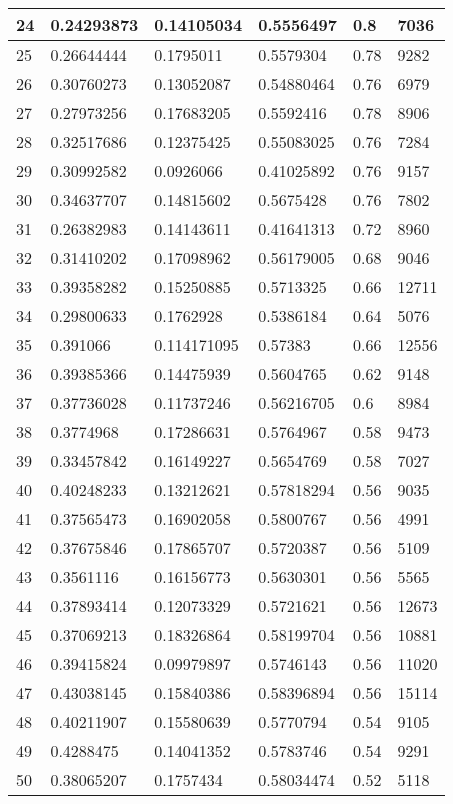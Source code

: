 \begin{longtable}{|l|l|l|l|l|l|}
24 & 0.24293873 & 0.14105034 & 0.5556497 & 0.8 & 7036 \\ \hline 
25 & 0.26644444 & 0.1795011 & 0.5579304 & 0.78 & 9282 \\ \hline 
26 & 0.30760273 & 0.13052087 & 0.54880464 & 0.76 & 6979 \\ \hline 
27 & 0.27973256 & 0.17683205 & 0.5592416 & 0.78 & 8906 \\ \hline 
28 & 0.32517686 & 0.12375425 & 0.55083025 & 0.76 & 7284 \\ \hline 
29 & 0.30992582 & 0.0926066 & 0.41025892 & 0.76 & 9157 \\ \hline 
30 & 0.34637707 & 0.14815602 & 0.5675428 & 0.76 & 7802 \\ \hline 
31 & 0.26382983 & 0.14143611 & 0.41641313 & 0.72 & 8960 \\ \hline 
32 & 0.31410202 & 0.17098962 & 0.56179005 & 0.68 & 9046 \\ \hline 
33 & 0.39358282 & 0.15250885 & 0.5713325 & 0.66 & 12711 \\ \hline 
34 & 0.29800633 & 0.1762928 & 0.5386184 & 0.64 & 5076 \\ \hline 
35 & 0.391066 & 0.114171095 & 0.57383 & 0.66 & 12556 \\ \hline 
36 & 0.39385366 & 0.14475939 & 0.5604765 & 0.62 & 9148 \\ \hline 
37 & 0.37736028 & 0.11737246 & 0.56216705 & 0.6 & 8984 \\ \hline 
38 & 0.3774968 & 0.17286631 & 0.5764967 & 0.58 & 9473 \\ \hline 
39 & 0.33457842 & 0.16149227 & 0.5654769 & 0.58 & 7027 \\ \hline 
40 & 0.40248233 & 0.13212621 & 0.57818294 & 0.56 & 9035 \\ \hline 
41 & 0.37565473 & 0.16902058 & 0.5800767 & 0.56 & 4991 \\ \hline 
42 & 0.37675846 & 0.17865707 & 0.5720387 & 0.56 & 5109 \\ \hline 
43 & 0.3561116 & 0.16156773 & 0.5630301 & 0.56 & 5565 \\ \hline 
44 & 0.37893414 & 0.12073329 & 0.5721621 & 0.56 & 12673 \\ \hline 
45 & 0.37069213 & 0.18326864 & 0.58199704 & 0.56 & 10881 \\ \hline 
46 & 0.39415824 & 0.09979897 & 0.5746143 & 0.56 & 11020 \\ \hline 
47 & 0.43038145 & 0.15840386 & 0.58396894 & 0.56 & 15114 \\ \hline 
48 & 0.40211907 & 0.15580639 & 0.5770794 & 0.54 & 9105 \\ \hline 
49 & 0.4288475 & 0.14041352 & 0.5783746 & 0.54 & 9291 \\ \hline 
50 & 0.38065207 & 0.1757434 & 0.58034474 & 0.52 & 5118 \\ \hline 
\end{longtable}